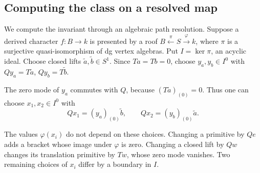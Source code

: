 \subsection{Computing the class on a resolved map}

We compute the invariant through an algebraic path
resolution. Suppose a derived character $f:B\to k$ is
presented by a roof
$B\xleftarrow{\pi}S\xrightarrow{\varphi}k$, where $\pi$
is a surjective quasi-isomorphism of dg vertex algebras.
Put $I=\ker\pi$, an acyclic ideal. Choose closed lifts
$\tilde a,\tilde b\in S^1$. Since $Ta=Tb=0$, choose
$y_a,y_b\in I^0$ with
$Qy_a=T\tilde a$, $Qy_b=T\tilde b$.

The zero mode of $y_a$ commutes with $Q$, because
$(T\tilde a)_{(0)}=0$. Thus one can choose $x_1,x_2\in I^0$
with
\begin{equation}\label{cbc:rc:character-bracket}
 Qx_1=(y_a)_{(0)}\tilde b,
 \qquad Qx_2=(y_b)_{(0)}\tilde a.
\end{equation}

The values $\varphi(x_i)$ do not depend on these choices.
Changing a primitive by $Qe$ adds a bracket whose image under
$\varphi$ is zero. Changing a closed lift by $Qw$ changes its
translation primitive by $Tw$, whose zero mode vanishes. Two remaining choices of $x_i$
differ by a boundary in $I$.

